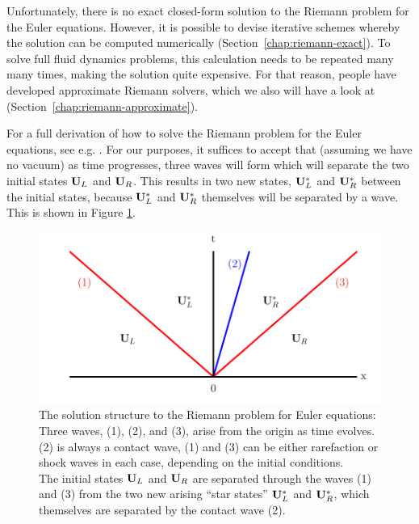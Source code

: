 Unfortunately, there is no exact closed-form solution to the Riemann problem
for the Euler equations. However, it is possible to devise iterative schemes
whereby the solution can be computed numerically
(Section~\ref{chap:riemann-exact}). To solve full fluid dynamics problems, this
calculation needs to be repeated many many times, making the solution quite
expensive. For that reason, people have developed approximate Riemann solvers,
which we also will have a look at (Section~\ref{chap:riemann-approximate}).



For a full derivation of how to solve the Riemann problem for the Euler
equations, see e.g. \cite{toro}. For our purposes, it suffices to accept that
(assuming we have no vacuum) as time progresses, three waves will form which
will separate the two initial states $\mathbf{U}_L$ and $\mathbf{U}_R$.
This results in two new states, $\mathbf{U}_L^*$ and $\mathbf{U}_R^*$ between the initial
states, because  $\mathbf{U}_L^*$ and $\mathbf{U}_R^*$ themselves will be separated by a wave.
This is shown in Figure \ref{fig:riemann-solution}.


\begin{figure}[H]
	\includegraphics{./figures/riemann_solution.pdf}%
	\caption{
The solution structure to the Riemann problem for Euler equations: Three waves,
(1), (2), and (3), arise from the origin as time evolves. (2) is always a
contact wave, (1) and (3) can be either rarefaction or shock waves in each
case, depending on the initial conditions.\\
The initial states $\mathbf{U}_L$ and $\mathbf{U}_R$ are separated through the waves (1) and
(3) from the two new arising ``star states'' $\mathbf{U}_L^*$ and $\mathbf{U}_R^*$, which
themselves are separated by the contact wave (2).
\label{fig:riemann-solution}
}
\end{figure}













